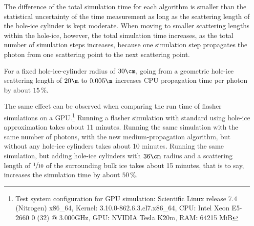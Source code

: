 
The difference of the total simulation time for each algorithm is smaller than the statistical uncertainty of the time measurement as long as the scattering length of the hole-ice cylinder is kept moderate. When moving to smaller scattering lengths within the hole-ice, however, the total simulation time increases, as the total number of simulation steps increases, because one simulation step propagates the photon from one scattering point to the next scattering point.

For a fixed hole-ice-cylinder radius of $30\cm$, going from a geometric hole-ice scattering length of $20\m$ to $0.005\m$ increases CPU propagation time per photon by about $15\,\%$.

%
%
%
%
%

The same effect can be observed when comparing the run time of flasher simulations on a GPU.\footnote{Test system configuration for GPU simulation: Scientific Linux release 7.4 (Nitrogen) x86\_64, Kernel: 3.10.0-862.6.3.el7.x86\_64, CPU: Intel Xeon E5-2660 0 (32) @ 3.000GHz, GPU: NVIDIA Tesla K20m, RAM: 64215 MiB}
Running a flasher simulation with standard \clsim using hole-ice approximation takes about 11 minutes. Running the same simulation with the same number of photons, with the new medium-propagation algorithm, but without any hole-ice cylinders takes about 10 minutes. Running the same simulation, but adding hole-ice cylinders with $36\cm$ radius and a scattering length of $\sfrac{1}{10}$ of the surrounding bulk ice takes about 15 minutes, that is to say, increases the simulation time by about $50\,\%$.

